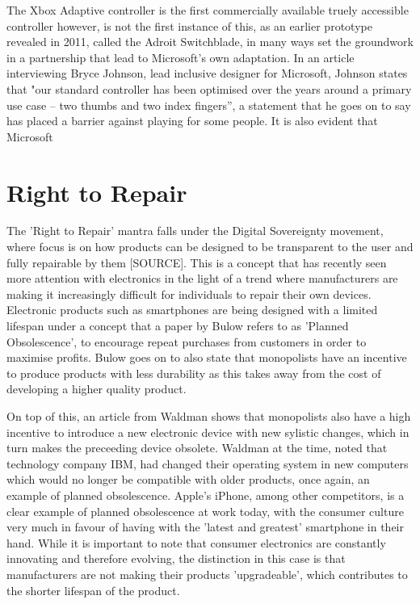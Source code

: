 The Xbox Adaptive controller is the first commercially available truely accessible controller however, is not the first instance of this, as an earlier prototype revealed in 2011, called the Adroit Switchblade\cite{ablegamer}, in many ways set the groundwork in a partnership that lead to Microsoft's own adaptation.
In an article interviewing Bryce Johnson, lead inclusive designer for Microsoft, Johnson states that "our standard controller has been optimised over the years around a primary use case – two thumbs and two index fingers”\cite{disabilitygaming}, a statement that he goes on to say has placed a barrier against playing for some people.
It is also evident that Microsoft %



\section{Right to Repair}

The 'Right to Repair' mantra falls under the Digital Sovereignty movement, where focus is on how products can be designed to be transparent to the user and fully repairable by them [SOURCE].
This is a concept that has recently seen more attention with electronics in the light of a trend where manufacturers are making it increasingly difficult for individuals to repair their own devices.
Electronic products such as smartphones are being designed with a limited lifespan under a concept that a paper by Bulow\cite{obsolescence} refers to as 'Planned Obsolescence', to encourage repeat purchases from customers in order to maximise profits.
Bulow goes on to also state that monopolists have an incentive to produce products with less durability as this takes away from the cost of developing a higher quality product.

On top of this, an article from Waldman shows that monopolists also have a high incentive to introduce a new electronic device with new sylistic changes, which in turn makes the preceeding device obsolete\cite{obsolescence2}.
Waldman at the time, noted that technology company IBM, had changed their operating system in new computers which would no longer be compatible with older products, once again, an example of planned obsolescence.
Apple's iPhone, among other competitors, is a clear example of planned obsolescence at work today, with the consumer culture very much in favour of having with the 'latest and greatest' smartphone in their hand.
While it is important to note that consumer electronics are constantly innovating and therefore evolving, the distinction in this case is that manufacturers are not making their products 'upgradeable', which contributes to the shorter lifespan of the product.

